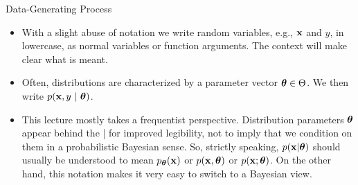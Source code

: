 \documentclass[11pt,compress,t,notes=noshow, xcolor=table]{beamer}
\begin{document}
\begin{vbframe}{Data-Generating Process}
\begin{itemize}
  \item With a slight abuse of notation we write random variables, e.g., $\mathbf{x}$ 
  and $y$, in lowercase, as normal variables or function arguments. The context 
  will make clear what is meant.
  
  \item Often, distributions are characterized by a parameter vector 
  $\bm{\theta} \in \Theta$. We then write $p(\mathbf{x}, y ~|~ \bm{\theta})$.
  
  \item This lecture mostly takes a frequentist perspective. Distribution 
  parameters $\bm{\theta}$ appear behind the | for improved legibility, not to imply 
  that we condition on them in a probabilistic Bayesian sense.
  So, strictly speaking, $p(\mathbf{x} | \bm{\theta})$ should usually be understood to mean 
  $p_{\bm{\theta}}(\mathbf{x})$ or $p(\mathbf{x}, \bm{\theta})$ or $p(\mathbf{x}; \bm{\theta})$.
  On the other hand, this notation makes it very easy to switch to a Bayesian view.

\end{itemize}

\end{vbframe}


\endlecture
\end{document}
